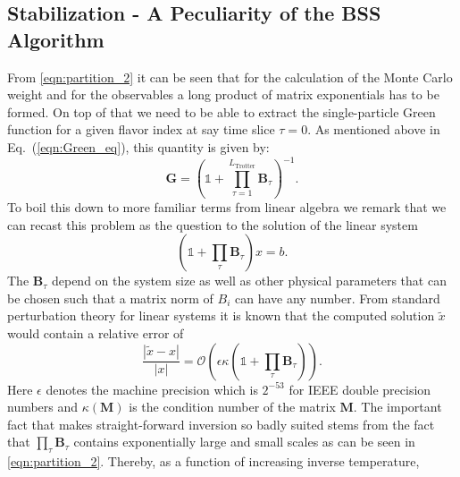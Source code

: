 %
\subsection{Stabilization - A Peculiarity of the BSS Algorithm}\label{sec:stable}
%
From \eqref{eqn:partition_2} it can be seen that for the calculation of the Monte Carlo weight
and for the observables a long product of matrix exponentials has to be formed.
On top of that we need to be able to extract the single-particle Green function  for a given flavor index at say time slice $\tau = 0$.  As  mentioned above in Eq.~(\ref{eqn:Green_eq}), this quantity is given by: 
\begin{equation}
\bm{G}= \left( \mathds{1} + \prod_{ \tau= 1}^{L_{\text{Trotter}}} \bm{B}_\tau \right)^{-1}.
\end{equation}
To boil this down to more familiar terms from linear algebra we remark that we can recast this problem as the question to the solution of the linear system
\begin{equation}
(\mathds{1} + \prod_\tau \bm{B}_\tau) x = b.
\end{equation}
The $\bm{B}_\tau$ depend on the system size as well as other physical parameters that can be chosen such that a matrix norm of $B_i$ can have any number.
From standard perturbation theory for linear systems it is known that the computed solution $\tilde{x}$ would 
contain a relative error of
\begin{equation}
\frac{|\tilde{x} - x|}{|x|} = \mathcal{O}\left(\epsilon \kappa(\mathds{1} + \prod_\tau \bm{B}_\tau)\right).
\end{equation}
Here $\epsilon$ denotes the machine precision which is $2^{-53}$ for IEEE double precision numbers
and $\kappa(\bm{M})$ is the condition number of the matrix $\bm{M}$.
The important fact that makes straight-forward inversion so badly suited  stems from the fact that $  \prod_ \tau \bm{B}_\tau $ contains exponentially large and small scales as can be seen in \eqref{eqn:partition_2}.  Thereby, as a function of increasing inverse temperature, 
